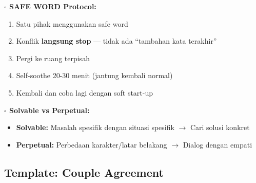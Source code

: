 \begin{tipbox}
\textbf{$\square$ SAFE WORD Protocol:}
\begin{enumerate}[itemsep=0.1cm]
    \item Satu pihak menggunakan safe word
    \item Konflik \textbf{langsung stop} --- tidak ada ``tambahan kata terakhir''
    \item Pergi ke ruang terpisah
    \item Self-soothe 20-30 menit (jantung kembali normal)
    \item Kembali dan coba lagi dengan soft start-up
\end{enumerate}

\textbf{$\square$ Solvable vs Perpetual:}
\begin{itemize}[itemsep=0.1cm]
    \item \textbf{Solvable:} Masalah spesifik dengan situasi spesifik $\rightarrow$ Cari solusi konkret
    \item \textbf{Perpetual:} Perbedaan karakter/latar belakang $\rightarrow$ Dialog dengan empati
\end{itemize}
\end{tipbox}

\subsection{Template: Couple Agreement}

